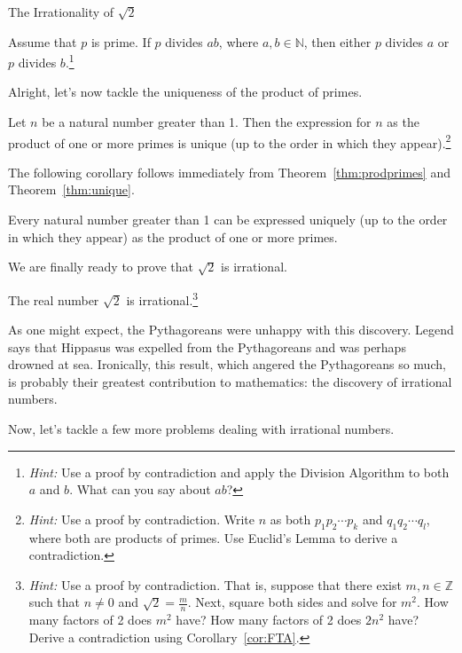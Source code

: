 \begin{section}{The Irrationality of $\sqrt{2}$}
\begin{theorem}\label{thm:Euclid}
Assume that $p$ is prime.  If $p$ divides $ab$, where $a,b\in\mathbb{N}$, then either $p$ divides $a$ or $p$ divides $b$.\footnote{\emph{Hint:} Use a proof by contradiction and apply the Division Algorithm to both $a$ and $b$.  What can you say about $ab$?}
\end{theorem}

Alright, let's now tackle the uniqueness of the product of primes.

\begin{theorem}\label{thm:unique}
Let $n$ be a natural number greater than 1.  Then the expression for $n$ as the product of one or more primes is unique (up to the order in which they appear).\footnote{\emph{Hint:} Use a proof by contradiction.  Write $n$ as both $p_1 p_2 \cdots p_k$ and $q_1 q_2 \cdots q_l$, where both are products of primes.  Use Euclid's Lemma to derive a contradiction.}
\end{theorem}

The following corollary follows immediately from Theorem~\ref{thm:prodprimes} and Theorem~\ref{thm:unique}.

\begin{corollary}\label{cor:FTA}
Every natural number greater than 1 can be expressed uniquely (up to the order in which they appear) as the product of one or more primes.
\end{corollary}

We are finally ready to prove that $\sqrt{2}$ is irrational.

\begin{theorem}
\label{thm:sqrt2}
The real number $\sqrt{2}$ is irrational.\footnote{\emph{Hint:} Use a proof by contradiction.  That is, suppose that there exist $m,n\in\mathbb{Z}$ such that $n\ne 0$ and $\sqrt{2}=\frac{m}{n}$. Next, square both sides and solve for $m^2$. How many factors of 2 does $m^2$ have?  How many factors of 2 does $2n^2$ have? Derive a contradiction using Corollary~\ref{cor:FTA}.}
\end{theorem}

As one might expect, the Pythagoreans were unhappy with this discovery. Legend says that Hippasus was expelled from the Pythagoreans and was perhaps drowned at sea. Ironically, this result, which angered the Pythagoreans so much, is probably their greatest contribution to mathematics: the discovery of irrational numbers.

Now, let's tackle a few more problems dealing with irrational numbers.


\end{section}

